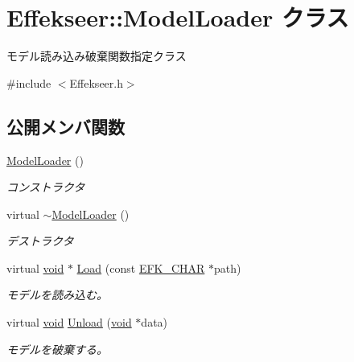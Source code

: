 \hypertarget{class_effekseer_1_1_model_loader}{}\section{Effekseer\+:\+:Model\+Loader クラス}
\label{class_effekseer_1_1_model_loader}


モデル読み込み破棄関数指定クラス  




{\ttfamily \#include $<$Effekseer.\+h$>$}

\subsection*{公開メンバ関数}
\begin{DoxyCompactItemize}
\item 
\mbox{\hyperlink{class_effekseer_1_1_model_loader_afc540fe063379c6412134edfa893c65e}{Model\+Loader}} ()
\begin{DoxyCompactList}\small\item\em コンストラクタ \end{DoxyCompactList}\item 
virtual \mbox{\hyperlink{class_effekseer_1_1_model_loader_a0edc24d2c8d4e3c18ef52f34ac5d5fc5}{$\sim$\+Model\+Loader}} ()
\begin{DoxyCompactList}\small\item\em デストラクタ \end{DoxyCompactList}\item 
virtual \mbox{\hyperlink{namespace_effekseer_ab34c4088e512200cf4c2716f168deb56}{void}} $\ast$ \mbox{\hyperlink{class_effekseer_1_1_model_loader_a46b7aba9f998836bacd86411b858d06c}{Load}} (const \mbox{\hyperlink{_effekseer_8h_aca7eb5de6dd019c19ac58ea35a193f2f}{E\+F\+K\+\_\+\+C\+H\+AR}} $\ast$path)
\begin{DoxyCompactList}\small\item\em モデルを読み込む。 \end{DoxyCompactList}\item 
virtual \mbox{\hyperlink{namespace_effekseer_ab34c4088e512200cf4c2716f168deb56}{void}} \mbox{\hyperlink{class_effekseer_1_1_model_loader_a496f93a8615363ff31943adb205b5365}{Unload}} (\mbox{\hyperlink{namespace_effekseer_ab34c4088e512200cf4c2716f168deb56}{void}} $\ast$data)
\begin{DoxyCompactList}\small\item\em モデルを破棄する。 \end{DoxyCompactList}\end{DoxyCompactItemize}


